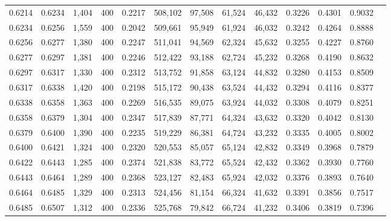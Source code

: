 \begin{tabular}{rrrrrrrrrrrrr}
0.6214 & 0.6234 &  1,404 & 400 &                                     0.2217 & 508,102 &  97,508 &  61,524 &  46,432 & 0.3226 & 0.4301 & 0.9032 \\
0.6234 & 0.6256 &  1,559 & 400 &                                     0.2042 & 509,661 &  95,949 &  61,924 &  46,032 & 0.3242 & 0.4264 & 0.8888 \\
0.6256 & 0.6277 &  1,380 & 400 &                                     0.2247 & 511,041 &  94,569 &  62,324 &  45,632 & 0.3255 & 0.4227 & 0.8760 \\
0.6277 & 0.6297 &  1,381 & 400 &                                     0.2246 & 512,422 &  93,188 &  62,724 &  45,232 & 0.3268 & 0.4190 & 0.8632 \\
0.6297 & 0.6317 &  1,330 & 400 &                                     0.2312 & 513,752 &  91,858 &  63,124 &  44,832 & 0.3280 & 0.4153 & 0.8509 \\
0.6317 & 0.6338 &  1,420 & 400 &                                     0.2198 & 515,172 &  90,438 &  63,524 &  44,432 & 0.3294 & 0.4116 & 0.8377 \\
0.6338 & 0.6358 &  1,363 & 400 &                                     0.2269 & 516,535 &  89,075 &  63,924 &  44,032 & 0.3308 & 0.4079 & 0.8251 \\
0.6358 & 0.6379 &  1,304 & 400 &                                     0.2347 & 517,839 &  87,771 &  64,324 &  43,632 & 0.3320 & 0.4042 & 0.8130 \\
0.6379 & 0.6400 &  1,390 & 400 &                                     0.2235 & 519,229 &  86,381 &  64,724 &  43,232 & 0.3335 & 0.4005 & 0.8002 \\
0.6400 & 0.6421 &  1,324 & 400 &                                     0.2320 & 520,553 &  85,057 &  65,124 &  42,832 & 0.3349 & 0.3968 & 0.7879 \\
0.6422 & 0.6443 &  1,285 & 400 &                                     0.2374 & 521,838 &  83,772 &  65,524 &  42,432 & 0.3362 & 0.3930 & 0.7760 \\
0.6443 & 0.6464 &  1,289 & 400 &                                     0.2368 & 523,127 &  82,483 &  65,924 &  42,032 & 0.3376 & 0.3893 & 0.7640 \\
0.6464 & 0.6485 &  1,329 & 400 &                                     0.2313 & 524,456 &  81,154 &  66,324 &  41,632 & 0.3391 & 0.3856 & 0.7517 \\
0.6485 & 0.6507 &  1,312 & 400 &                                     0.2336 & 525,768 &  79,842 &  66,724 &  41,232 & 0.3406 & 0.3819 & 0.7396 \\

\end{tabular}
